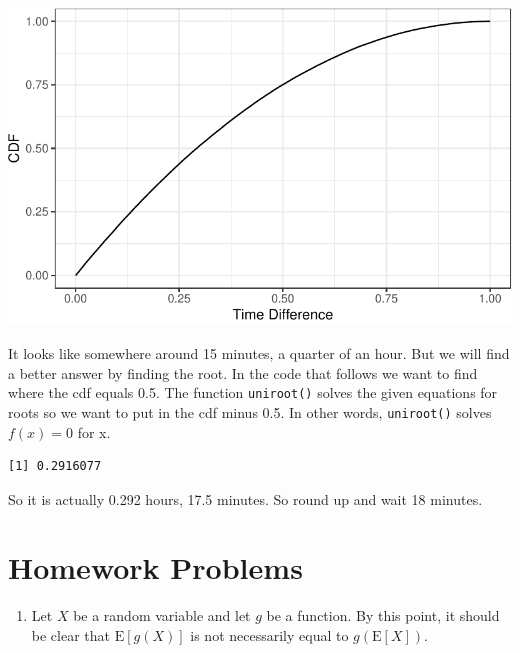 \documentclass[
  letterpaper,
  DIV=11,
  numbers=noendperiod]{scrreprt}
\newenvironment{Shaded}{\begin{snugshade}}{\end{snugshade}}
\newcommand{\ControlFlowTok}[1]{\textcolor[rgb]{0.00,0.23,0.31}{#1}}
\newcommand{\DecValTok}[1]{\textcolor[rgb]{0.68,0.00,0.00}{#1}}
\newcommand{\FunctionTok}[1]{\textcolor[rgb]{0.28,0.35,0.67}{#1}}
\newcommand{\NormalTok}[1]{\textcolor[rgb]{0.00,0.23,0.31}{#1}}
\newcommand{\SpecialCharTok}[1]{\textcolor[rgb]{0.37,0.37,0.37}{#1}}
\providecommand{\tightlist}{%
  \setlength{\itemsep}{0pt}\setlength{\parskip}{0pt}}\usepackage{longtable,booktabs,array}
\begin{document}
\includegraphics{16-Transformations_files/figure-pdf/unnamed-chunk-21-1.pdf}

It looks like somewhere around 15 minutes, a quarter of an hour. But we
will find a better answer by finding the root. In the code that follows
we want to find where the cdf equals 0.5. The function
\texttt{uniroot()} solves the given equations for roots so we want to
put in the cdf minus 0.5. In other words, \texttt{uniroot()} solves
\(f(x)=0\) for x.

\begin{Shaded}
\end{Shaded}

\begin{verbatim}
[1] 0.2916077
\end{verbatim}

So it is actually 0.292 hours, 17.5 minutes. So round up and wait 18
minutes.

\section{Homework Problems}\label{homework-problems-15}

\begin{enumerate}
\def\labelenumi{\arabic{enumi}.}
\tightlist
\item
  Let \(X\) be a random variable and let \(g\) be a function. By this
  point, it should be clear that \(\mbox{E}[g(X)]\) is not necessarily
  equal to \(g(\mbox{E}[X])\).
\end{enumerate}
\end{document}
